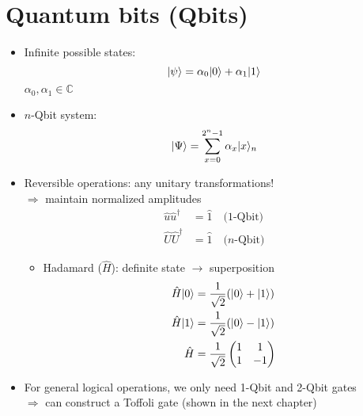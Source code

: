 \documentclass{../doc}
\begin{document}
  \section{Quantum bits (Qbits)}
    \begin{itemize}
      \item Infinite possible states:
        \begin{equation}
          | \psi \rangle = \alpha_0 | 0 \rangle + \alpha_1 | 1 \rangle
        \end{equation}
        $\alpha_0, \alpha_1 \in \mathbb{C}$
      \item $n$-Qbit system:
        \begin{equation}
          | \Psi \rangle = \sum_{x=0}^{2^n-1} \alpha_x | x \rangle_n
        \end{equation}
      \item Reversible operations: any unitary transformations! \\
        $\Rightarrow$ maintain normalized amplitudes
        \begin{align}
          \hat u \hat u^\dagger &= \hat 1 \quad\text{(1-Qbit)}\\
          \hat U \hat U^\dagger &= \hat 1 \quad\text{($n$-Qbit)}
        \end{align}
        \begin{itemize}
          \item Hadamard ($\hat H$): definite state $\to$ superposition
            \begin{align}
              \hat H | 0 \rangle &= \frac{1}{\sqrt{2}} (| 0 \rangle + | 1 \rangle) \\
              \hat H | 1 \rangle &= \frac{1}{\sqrt{2}} (| 0 \rangle - | 1 \rangle) \\
              \hat H &= \frac{1}{\sqrt{2}} \begin{pmatrix}
                1 & 1 \\
                1 & -1
              \end{pmatrix}
            \end{align}
        \end{itemize}
      \item For general logical operations, we only need 1-Qbit and 2-Qbit gates \\
        $\Rightarrow$ can construct a Toffoli gate (shown in the next chapter)
    \end{itemize}
  
\end{document}
